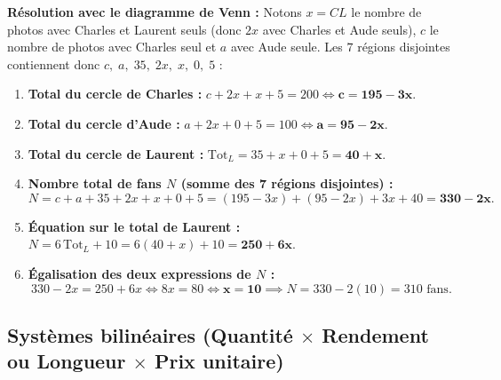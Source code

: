\begin{exemple}
\textbf{Résolution avec le diagramme de Venn :}
Notons $x = CL$ le nombre de photos avec Charles et Laurent seuls (donc $2x$ avec Charles et Aude seuls), $c$ le nombre de photos avec Charles seul et $a$ avec Aude seule. Les $7$ régions disjointes contiennent donc $c,\; a,\; 35,\; 2x,\; x,\; 0,\; 5$ :
\begin{enumerate}
    \item \textbf{Total du cercle de Charles :} $c + 2x + x + 5 = 200 \iff \mathbf{c = 195 - 3x}$.
    \item \textbf{Total du cercle d'Aude :} $a + 2x + 0 + 5 = 100 \iff \mathbf{a = 95 - 2x}$.
    \item \textbf{Total du cercle de Laurent :} $\text{Tot}_L = 35 + x + 0 + 5 = \mathbf{40 + x}$.
    \item \textbf{Nombre total de fans $N$ (somme des 7 régions disjointes) :}
    \[
        N = c + a + 35 + 2x + x + 0 + 5 = (195 - 3x) + (95 - 2x) + 3x + 40 = \mathbf{330 - 2x}.
    \]
    \item \textbf{Équation sur le total de Laurent :} $N = 6\,\text{Tot}_L + 10 = 6(40 + x) + 10 = \mathbf{250 + 6x}$.
    \item \textbf{Égalisation des deux expressions de $N$ :}
    \[
        330 - 2x = 250 + 6x \iff 8x = 80 \iff \mathbf{x = 10} \implies N = 330 - 2(10) = \boxed{310\text{ fans}}.
    \]
\end{enumerate}
\end{exemple}

\subsection{Systèmes bilinéaires (Quantité $\times$ Rendement ou Longueur $\times$ Prix unitaire)}

